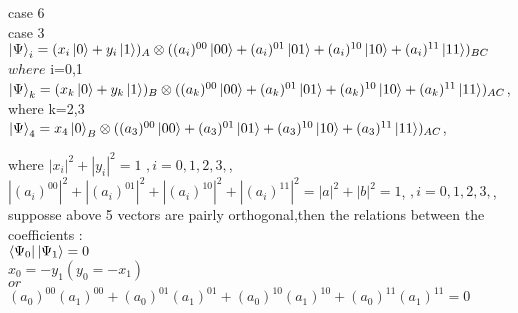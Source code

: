 \documentclass[a4paper,12pt]{article}
\begin{document}
\leavevmode\\
\newline \\
case 6
\newline \\
case 3
\newline \\
$\ket{\Psi}_{i}=(x_{i}\ket{0}+y_{i}\ket{1})_{A}\otimes ((a_{i})^{00}\ket{00}+(a_{i})^{01}\ket{01}+(a_{i})^{10}\ket{10}+(a_{i})^{11}\ket{11})_{BC}     $  $where $ i=0,1$  $
\newline \\
$\ket{\Psi}_{k}=(x_{k}\ket{0}+y_{k}\ket{1})_{B}\otimes((a_{k})^{00}\ket{00}+(a_{k})^{01}\ket{01}+(a_{k})^{10}\ket{10}+(a_{k})^{11}\ket{11})_{AC}$, where k=2,3
\newline \\
$\ket{\Psi}_{4}=x_{4}\ket{0}_{B}\otimes((a_{3})^{00}\ket{00}+(a_{3})^{01}\ket{01}+(a_{3})^{10}\ket{10}+(a_{3})^{11}\ket{11})_{AC}$,

where $|x_{i}|^{2}+|y_{i}|^{2}=1     $ $       ,i=0,1,2,3,$,
\newline \\
$|(a_{i})^{00}|^{2}+|(a_{i})^{01}|^{2}+|(a_{i})^{10}|^{2}+|(a_{i})^{11}|^{2}=|a|^{2}+|b|^{2}=1     $,    $       ,i=0,1,2,3,$,
\newline \\
supposse above 5 vectors are pairly orthogonal,then the relations between the coefficients :
\newline \\
$\bra{\Psi_{0}}\ket{\Psi_{1}}=0        $ 
\newline \\
$x_{0}=-y_{1}(y_{0}=-x_{1})$  
\newline \\
$or  $ 
\newline \\
$(a_{0})^{00}(a_{1})^{00}+(a_{0})^{01}(a_{1})^{01}+(a_{0})^{10}(a_{1})^{10}+(a_{0})^{11}(a_{1})^{11}=0$
\leavevmode








\leavevmode
\newline \\
\end{document}
